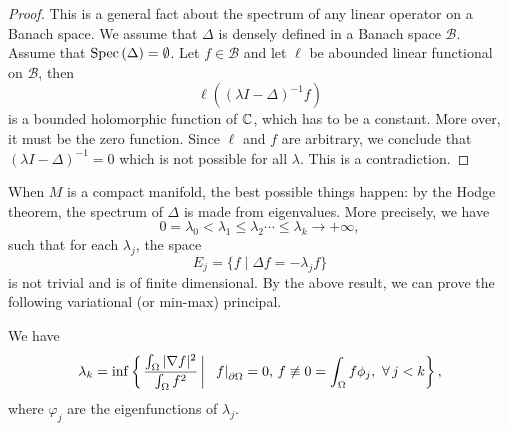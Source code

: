 \begin{proof} This is a general fact about the spectrum of any linear operator on a Banach space.
We assume that $\Delta$ is densely defined in a Banach space $\mathcal B$. Assume that 
${\rm Spec} \,(\Delta)=\emptyset$.
Let $f\in \mathcal B$ and let $\ell$ be abounded linear functional on $\mathcal B$, then
\[
\ell((\lambda I-\Delta)^{-1}f)
\]
is a bounded holomorphic function of $\mathbb C$, which has to be a constant. More over, it must be the zero function. Since $\ell$ and $f$ are arbitrary, we conclude that $(\lambda I-\Delta)^{-1}=0$ which is not possible for all $\lambda$. This is a contradiction.

\end{proof}




When $M$ is a compact manifold, the best possible things happen: by the Hodge theorem, the spectrum of $\Delta$ is made from eigenvalues. More precisely, we have
\[
0=\lambda_0<\lambda_1\leq\lambda_2\cdots\leq\lambda_k\to +\infty,
\]
such that for each $\lambda_j$, the space
\[
E_j=\{f\mid\Delta f=-\lambda_j f\}
\]
is not trivial and is of finite dimensional. By the above result, we can prove the following variational (or min-max) principal.

\begin{theorem} We have
\begin{equation} \lambda_k = \inf \left\{ \left. \frac{ \int_{\Omega} |\nabla f |^2 }{\int_{\Omega} f^2 } \, \right| \, \, \, \left. f\right|_{\partial \Omega} = 0, \, f \not\equiv 0 = \int_{\Omega} f \phi_j, \, \, \forall \, j < k \right\} , \end{equation} 
where $\varphi_j$ are the eigenfunctions of $\lambda_j$.
\end{theorem}

